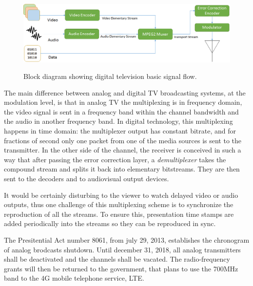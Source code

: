 \documentclass[
	12pt,				%
	openright,			%
	twoside,			%
	a4paper,			%
	brazil,
	french,				%
	english
	]{abntex2}
\begin{document}
 \begin{figure}[!h]
\centering
\caption{Block diagram showing digital television basic signal flow.}
\includegraphics[width=1\linewidth]{figuras/diagrama_blocos_tvd.png}
\label{fig:diagrama_blocos_tvd}
\end{figure}
 
The main difference between analog and digital TV broadcasting systems, at the modulation level, is that in analog TV the multiplexing is in frequency domain, the video signal is sent in a frequency band within the channel bandwidth and the audio in another frequency band. In digital technology, this multiplexing happens in time domain: the multiplexer output has constant bitrate, and for fractions of second only one packet from one of the media sources is sent to the transmitter. In the other side of the channel, the receiver is conceived in such a way that after passing the error correction layer, a \textit{demultiplexer} takes the compound stream and splits it back into elementary bitstreams. They are then sent to the decoders and to audiovisual output devices.

It would be certainly disturbing to the viewer to watch delayed video or audio outputs, thus one challenge of this multiplexing scheme is to synchronize the reproduction of all the streams. To ensure this, presentation time stamps are added periodically into the streams so they can be reproduced in sync.


The Presitential Act number 8061\cite{decreto8061}, from july 29, 2013, establishes the chronogram of analog brodcasts shutdown. Until december 31, 2018, all analog transmitters shall be deactivated and the channels shall be vacated. The radio-frequency grants will then be returned to the government, that plans to use the 700MHz band to the 4G mobile telephone service, LTE.
\end{document}
